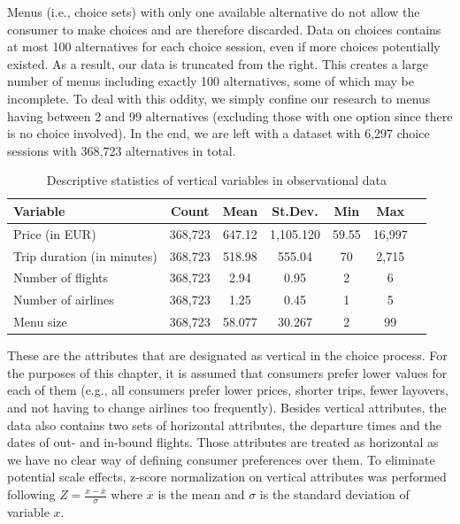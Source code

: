 \documentclass[a4paper,12pt]{article}
\begin{document}
Menus (i.e., choice sets) with only one available alternative do not allow the consumer to make choices and are therefore discarded. Data on choices contains at most 100 alternatives for each choice session, even if more choices potentially existed. As a result, our data is truncated from the right. This creates a large number of menus including exactly 100 alternatives, some of which may be incomplete. To deal with this oddity, we simply confine our research to menus having between 2 and 99 alternatives (excluding those with one option since there is no choice involved).  In the end, we are left with a dataset with  6,297 choice sessions with 368,723 alternatives in total.


\begin{table}
    \centering
    
    \begin{tabular}{l|cccccc}
    \hline
    Variable & Count & Mean & St.Dev. & Min & Max \\
    \hline
    Price (in EUR) & 368,723 & 647.12 & 1,105.120 & 59.55 & 16,997 \\
    Trip duration (in minutes) & 368,723 & 518.98 & 555.04 & 70 & 2,715 \\
    Number of flights & 368,723 & 2.94 & 0.95 & 2 & 6 \\
    Number of airlines & 368,723 & 1.25 & 0.45 & 1 & 5 \\
    Menu size & 368,723 & 58.077 & 30.267 & 2 & 99 \\
    \hline
    \end{tabular}
    \caption{Descriptive statistics of vertical variables in observational data}
    \label{tab:descriptiveStats}
\end{table}

These are the attributes that are designated as vertical in the choice process. For the purposes of this chapter, it is  assumed that consumers prefer lower values for each of them (e.g., all consumers prefer lower prices, shorter trips, fewer layovers, and not having to change airlines too frequently). Besides vertical attributes, the data also contains two sets of horizontal attributes, the departure times and the dates of out- and in-bound flights. Those attributes are treated as horizontal as we have no clear way of defining consumer preferences over them. To eliminate potential scale effects, z-score normalization on vertical attributes was performed following  $Z = \frac{{x - \overline{x}}}{{\sigma}}
$ where $\overline{x}$ is the mean and $\sigma$ is the standard deviation of variable $x$. 
\end{document}
